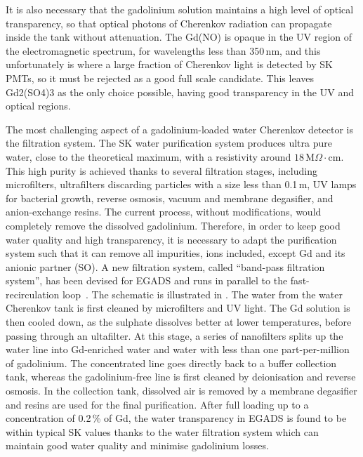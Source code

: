 It is also necessary that the gadolinium solution maintains a high level of optical transparency, %
so that optical photons of Cherenkov radiation can propagate inside the tank without attenuation.
The Gd(NO) is opaque in the UV region of the electromagnetic spectrum, for wavelengths less than 350\,nm, %
and this unfortunately is where a large fraction of Cherenkov light is detected by SK PMTs, %
so it must be rejected as a good full scale candidate.
This leaves Gd2(SO4)3 as the only choice possible, having good transparency in the UV and optical regions.

The most challenging aspect of a gadolinium-loaded water Cherenkov detector is the filtration system.
The SK water purification system produces ultra pure water, close to the theoretical maximum, %
with a resistivity around $18$\,M$\Omega\cdot$cm.
This high purity is achieved thanks to several filtration stages, including microfilters, %
ultrafilters discarding particles with a size less than 0.1\,\textmu m, UV lamps for bacterial growth, %
reverse osmosis, vacuum and membrane degasifier, and anion-exchange resins.
The current process, without modifications, would completely remove the dissolved gadolinium.
Therefore, in order to keep good water quality and high transparency, it is necessary to adapt the purification system %
such that it can remove all impurities, ions included, except Gd and its anionic partner (SO).
A new filtration system, called ``band-pass filtration system'', has been devised for EGADS and runs in parallel to %
the fast-recirculation loop~\cite{Ikeda:2019pcm}.
The schematic is illustrated in .
The water from the water Cherenkov tank is first cleaned by microfilters and UV light.
The Gd solution is then cooled down, as the sulphate dissolves better at lower temperatures, %
before passing through an ultafilter.
At this stage, a series of nanofilters splits up the water line into Gd-enriched water and %
water with less than one part-per-million of gadolinium.
The concentrated line goes directly back to a buffer collection tank, whereas the gadolinium-free line %
is first cleaned by deionisation and reverse osmosis.
In the collection tank, dissolved air is removed by a membrane degasifier and resins are used %
for the final purification.
After full loading up to a concentration of 0.2\,\% of Gd, the water transparency in EGADS is found to be within typical SK values %
thanks to the water filtration system which can maintain good water quality and minimise gadolinium losses.


